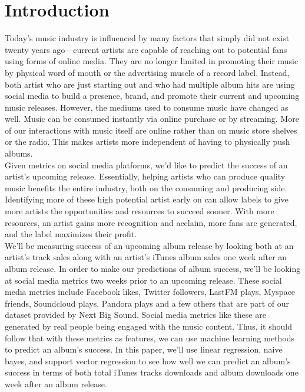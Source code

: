 \documentclass[conference]{IEEEtran}
\begin{document}
\section{Introduction}
Today's music industry is influenced by many factors that simply did not exist twenty years ago---current artists are capable of reaching out to potential fans using forms of online media. They are no longer limited in promoting their music by physical word of mouth or the advertising muscle of a record label. Instead, both artist who are just starting out and who had multiple album hits are using social media to build a presence, brand, and promote their current and upcoming music releases. However, the mediums used to consume music have changed as well. Music can be consumed instantly via online purchase or by streaming. More of our interactions with music itself are online rather than on music store shelves or the radio. This makes artists more independent of having to physically push albums.\\

Given metrics on social media platforms, we'd like to predict the success of an artist's upcoming release. Essentially, helping artists who can produce quality music benefits the entire industry, both on the consuming and producing side. Identifying more of these high potential artist early on can allow labels to give more artists the opportunities and resources to succeed sooner. With more resources, an artist gains more recognition and acclaim, more fans are generated, and the label maximizes their profit.\\

We'll be measuring success of an upcoming album release by looking both at an artist's track sales along with an artist's iTunes album sales one week after an album release. In order to make our predictions of album success, we'll be looking at social media metrics two weeks prior to an upcoming release. These social media metrics include Facebook likes, Twitter followers, LastFM plays, Myspace friends, Soundcloud plays, Pandora plays and a few others that are part of our dataset provided by Next Big Sound. Social media metrics like these are generated by real people being engaged with the music content. Thus, it should follow that with these metrics as features, we can use machine learning methods to predict an album's success. In this paper, we'll use linear regression, naive bayes, and support vector regression to see how well we can predict an album's success in terms of both total iTunes tracks downloads and album downloads one week after an album release.\\
\end{document}
